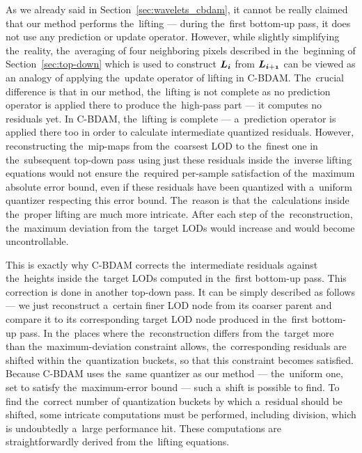 As we already said in Section~\ref{sec:wavelets_cbdam}, it cannot be really claimed that our method performs the~lifting --- during the~first bottom-up pass, it does not use any prediction or update operator. However, while slightly simplifying the~reality, the~averaging of four neighboring pixels described in the~beginning of Section~\ref{sec:top-down} which is used to construct $\lnorm{i}$ from $\lnorm{i+1}$ can be viewed as an analogy of applying the~update operator of lifting in C-BDAM. The~crucial difference is that in our method, the~lifting is not complete as no prediction operator is applied there to produce the~high-pass part --- it computes no residuals yet. In C-BDAM, the~lifting is complete --- a~prediction operator is applied there too in order to calculate intermediate quantized residuals. However, reconstructing the~mip-maps from the~coarsest LOD to the~finest one in the~subsequent top-down pass using just these residuals inside the~inverse lifting equations would not ensure the~required per-sample satisfaction of the~maximum absolute error bound, even if these residuals have been quantized with a~uniform quantizer respecting this error bound. The~reason is that the~calculations inside the~proper lifting are much more intricate. After each step of the~reconstruction, the~maximum deviation from the~target LODs would increase and would become uncontrollable. 

This is exactly why C-BDAM corrects the~intermediate residuals against the~heights inside the~target LODs computed in the~first bottom-up pass. This correction is done in another top-down pass. It can be simply described as follows --- we just reconstruct a~certain finer LOD node from its coarser parent and compare it to its corresponding target LOD node produced in the~first bottom-up pass. In the~places where the~reconstruction differs from the~target more than the~maximum-deviation constraint allows, the~corresponding residuals are shifted within the~quantization buckets, so that this constraint becomes satisfied. Because C-BDAM uses the~same quantizer as our method --- the~uniform one, set to satisfy the~maximum-error bound --- such a~shift is possible to find. To find the~correct number of quantization buckets by which a~residual should be shifted, some intricate computations must be performed, including division, which is undoubtedly a~large performance hit. These computations are straightforwardly derived from the~lifting equations.

